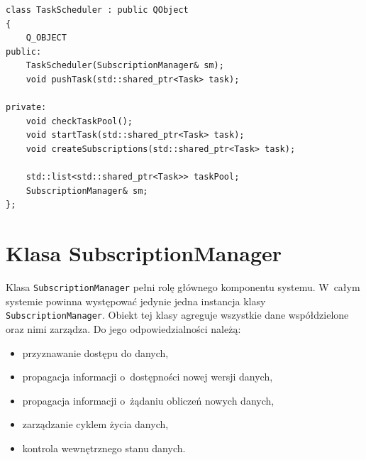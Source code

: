 \begin{minipage}{\textwidth}
	\begin{lstlisting}[label=scheduler:interface, caption={Deklaracja klasy \lstinline$TaskScheduler$},alsoletter={()[].=}]
class TaskScheduler : public QObject
{
	Q_OBJECT
public:
	TaskScheduler(SubscriptionManager& sm);
	void pushTask(std::shared_ptr<Task> task);

private:
	void checkTaskPool();
	void startTask(std::shared_ptr<Task> task);
	void createSubscriptions(std::shared_ptr<Task> task);

	std::list<std::shared_ptr<Task>> taskPool;
	SubscriptionManager& sm;
};
	\end{lstlisting}
\end{minipage}

\section{Klasa SubscriptionManager}
Klasa \lstinline$SubscriptionManager$ pełni rolę głównego komponentu systemu. W~całym systemie powinna występować jedynie jedna instancja klasy \lstinline$SubscriptionManager$. Obiekt tej klasy agreguje wszystkie dane współdzielone oraz nimi zarządza. Do jego odpowiedzialności należą:
\begin{itemize}
	\item przyznawanie dostępu do danych,
	\item propagacja informacji o~dostępności nowej wersji danych,
	\item propagacja informacji o~żądaniu obliczeń nowych danych,
	\item zarządzanie cyklem życia danych,
	\item kontrola wewnętrznego stanu danych.
\end{itemize}

